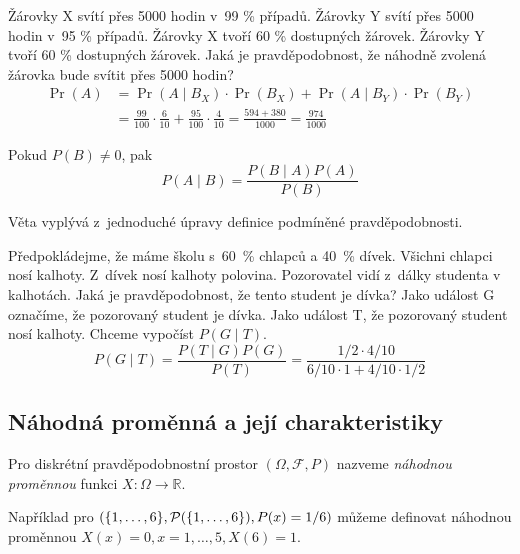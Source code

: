 \begin{example}
    Žárovky X svítí přes 5000 hodin v~99 \% případů.
    Žárovky Y svítí přes 5000 hodin v~95 \% případů.
    Žárovky X tvoří 60 \% dostupných žárovek.
    Žárovky Y tvoří 60 \% dostupných žárovek.
    Jaká je pravděpodobnost, že náhodně zvolená žárovka
    bude svítit přes 5000 hodin?
    \[
 {\displaystyle {\begin{aligned}\Pr(A)&=\Pr(A\mid B_{X})\cdot \Pr(B_{X})+\Pr(A\mid B_{Y})\cdot \Pr(B_{Y})\\[4pt]&=\frac{99}{100}\cdot \frac{6}{10}+\frac{95}{100}\cdot \frac{4}{10}=\frac{594+380}{1000}=\frac{974}{1000}\end{aligned}}}
\]
\end{example}

\begin{theorem}[Bayes]
    Pokud $P(B) \neq 0$, pak
    \[
    P(A \mid B) = \frac{P(B \mid A)P(A)}{P(B)}
    \]
\end{theorem}

Věta vyplývá z~jednoduché úpravy definice podmíněné pravděpodobnosti.

\begin{example}
Předpokládejme, že máme školu s~60~\% chlapců
a 40~\% dívek. Všichni chlapci nosí kalhoty.
Z~dívek nosí kalhoty polovina. Pozorovatel vidí z~dálky studenta v kalhotách.
Jaká je pravděpodobnost, že tento student je dívka?
Jako událost G označíme, že pozorovaný student je dívka. Jako událost T,
že pozorovaný student nosí kalhoty. Chceme vypočíst $P(G \mid T)$.
\[
    P(G \mid T)
    = \frac{P(T \mid G)P(G)}{P(T)}
    = \frac{1/2 \cdot 4/10}{6/10 \cdot 1 + 4/10 \cdot 1/2}
\]
\end{example}

\subsection{Náhodná proměnná a její charakteristiky}

\begin{definition}
    Pro diskrétní pravděpodobnostní prostor $(\Omega, \mathcal{F}, P)$
    nazveme {\em náhodnou proměnnou} funkci $X : \Omega \to \mathbb{R}$.
\end{definition}

\begin{example}
    Například pro
    $(\{1,\ldots,6\}, \mathcal{P}(\{1,\ldots,6\}), P(x) = 1/6)$
    můžeme definovat náhodnou proměnnou
    $X(x) = 0, x = 1,\ldots,5, X(6) = 1$.
\end{example}


